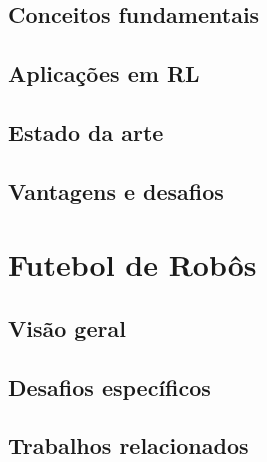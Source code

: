 \subsection{Conceitos fundamentais}
\label{subsec:curriculum_conceitos}

\subsection{Aplicações em RL}
\label{subsec:curriculum_rl}

\subsection{Estado da arte}
\label{subsec:curriculum_estado_arte}

\subsection{Vantagens e desafios}
\label{subsec:curriculum_vantagens_desafios}

\section{Futebol de Robôs}
\label{sec:futebol_robos}

\subsection{Visão geral}
\label{subsec:futebol_visao}

\subsection{Desafios específicos}
\label{subsec:futebol_desafios}

\subsection{Trabalhos relacionados}
\label{subsec:futebol_trabalhos}